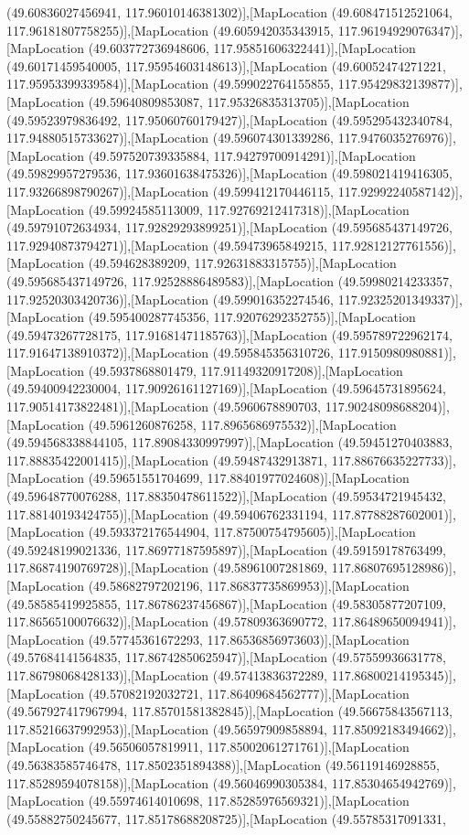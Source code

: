 (49.60836027456941, 117.96010146381302)],[MapLocation (49.608471512521064, 117.96181807758255)],[MapLocation (49.605942035343915, 117.96194929076347)],[MapLocation (49.603772736948606, 117.95851606322441)],[MapLocation (49.60171459540005, 117.95954603148613)],[MapLocation (49.60052474271221, 117.95953399339584)],[MapLocation (49.599022764155855, 117.95429832139877)],[MapLocation (49.59640809853087, 117.95326835313705)],[MapLocation (49.59523979836492, 117.95060760179427)],[MapLocation (49.595295432340784, 117.94880515733627)],[MapLocation (49.596074301339286, 117.9476035276976)],[MapLocation (49.597520739335884, 117.94279700914291)],[MapLocation (49.59829957279536, 117.93601638475326)],[MapLocation (49.598021419416305, 117.93266898790267)],[MapLocation (49.599412170446115, 117.92992240587142)],[MapLocation (49.59924585113009, 117.92769212417318)],[MapLocation (49.59791072634934, 117.92829293899251)],[MapLocation (49.595685437149726, 117.92940873794271)],[MapLocation (49.59473965849215, 117.92812127761556)],[MapLocation (49.594628389209, 117.92631883315755)],[MapLocation (49.595685437149726, 117.92528886489583)],[MapLocation (49.59980214233357, 117.92520303420736)],[MapLocation (49.599016352274546, 117.92325201349337)],[MapLocation (49.595400287745356, 117.92076292352755)],[MapLocation (49.59473267728175, 117.91681471185763)],[MapLocation (49.595789722962174, 117.91647138910372)],[MapLocation (49.595845356310726, 117.9150980980881)],[MapLocation (49.5937868801479, 117.91149320917208)],[MapLocation (49.59400942230004, 117.90926161127169)],[MapLocation (49.59645731895624, 117.90514173822481)],[MapLocation (49.5960678890703, 117.90248098688204)],[MapLocation (49.5961260876258, 117.8965686975532)],[MapLocation (49.594568338844105, 117.89084330997997)],[MapLocation (49.59451270403883, 117.88835422001415)],[MapLocation (49.59487432913871, 117.88676635227733)],[MapLocation (49.59651551704699, 117.88401977024608)],[MapLocation (49.59648770076288, 117.88350478611522)],[MapLocation (49.59534721945432, 117.88140193424755)],[MapLocation (49.59406762331194, 117.87788287602001)],[MapLocation (49.593372176544904, 117.87500754795605)],[MapLocation (49.59248199021336, 117.86977187595897)],[MapLocation (49.59159178763499, 117.86874190769728)],[MapLocation (49.58961007281869, 117.86807695128986)],[MapLocation (49.58682797202196, 117.86837735869953)],[MapLocation (49.58585419925855, 117.86786237456867)],[MapLocation (49.58305877207109, 117.86565100076632)],[MapLocation (49.57809363690772, 117.86489650094941)],[MapLocation (49.57745361672293, 117.86536856973603)],[MapLocation (49.57684141564835, 117.86742850625947)],[MapLocation (49.57559936631778, 117.86798068428133)],[MapLocation (49.57413836372289, 117.86800214195345)],[MapLocation (49.57082192032721, 117.86409684562777)],[MapLocation (49.567927417967994, 117.85701581382845)],[MapLocation (49.56675843567113, 117.85216637992953)],[MapLocation (49.56597909858894, 117.85092183494662)],[MapLocation (49.56506057819911, 117.85002061271761)],[MapLocation (49.56383585746478, 117.8502351894388)],[MapLocation (49.56119146928855, 117.85289594078158)],[MapLocation (49.56046990305384, 117.85304654942769)],[MapLocation (49.55974614010698, 117.85285976569321)],[MapLocation (49.55882750245677, 117.85178688208725)],[MapLocation (49.55785317091331, 